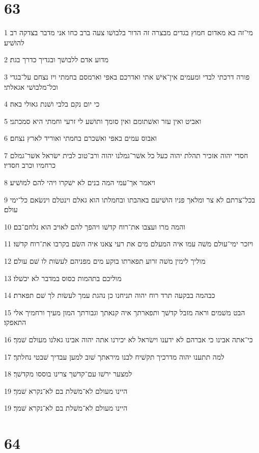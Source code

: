 \chapter{63}

\par 1 מי־זה בא מאדום חמוץ בגדים מבצרה זה הדור בלבושׁו צעה ברב כחו אני מדבר בצדקה רב להושׁיע׃
\par 2 מדוע אדם ללבושׁך ובגדיך כדרך בגת׃
\par 3 פורה דרכתי לבדי ומעמים אין־אישׁ אתי ואדרכם באפי וארמסם בחמתי ויז נצחם על־בגדי וכל־מלבושׁי אגאלתי׃
\par 4 כי יום נקם בלבי ושׁנת גאולי באה׃
\par 5 ואביט ואין עזר ואשׁתומם ואין סומך ותושׁע לי זרעי וחמתי היא סמכתני׃
\par 6 ואבוס עמים באפי ואשׁכרם בחמתי ואוריד לארץ נצחם׃
\par 7 חסדי יהוה אזכיר תהלת יהוה כעל כל אשׁר־גמלנו יהוה ורב־טוב לבית ישׂראל אשׁר־גמלם כרחמיו וכרב חסדיו׃
\par 8 ויאמר אך־עמי המה בנים לא ישׁקרו ויהי להם למושׁיע׃
\par 9 בכל־צרתם לא צר ומלאך פניו הושׁיעם באהבתו ובחמלתו הוא גאלם וינטלם וינשׂאם כל־ימי עולם׃
\par 10 והמה מרו ועצבו את־רוח קדשׁו ויהפך להם לאויב הוא נלחם־בם׃
\par 11 ויזכר ימי־עולם משׁה עמו איה המעלם מים את רעי צאנו איה השׂם בקרבו את־רוח קדשׁו׃
\par 12 מוליך לימין משׁה זרוע תפארתו בוקע מים מפניהם לעשׂות לו שׁם עולם׃
\par 13 מוליכם בתהמות כסוס במדבר לא יכשׁלו׃
\par 14 כבהמה בבקעה תרד רוח יהוה תניחנו כן נהגת עמך לעשׂות לך שׁם תפארת׃
\par 15 הבט משׁמים וראה מזבל קדשׁך ותפארתך איה קנאתך וגבורתך המון מעיך ורחמיך אלי התאפקו׃
\par 16 כי־אתה אבינו כי אברהם לא ידענו וישׂראל לא יכירנו אתה יהוה אבינו גאלנו מעולם שׁמך׃
\par 17 למה תתענו יהוה מדרכיך תקשׁיח לבנו מיראתך שׁוב למען עבדיך שׁבטי נחלתך׃
\par 18 למצער ירשׁו עם־קדשׁך צרינו בוססו מקדשׁך׃
\par 19 היינו מעולם לא־משׁלת בם לא־נקרא שׁמך׃
\par 19 היינו מעולם לא־משׁלת בם לא־נקרא שׁמך׃

\chapter{64}

